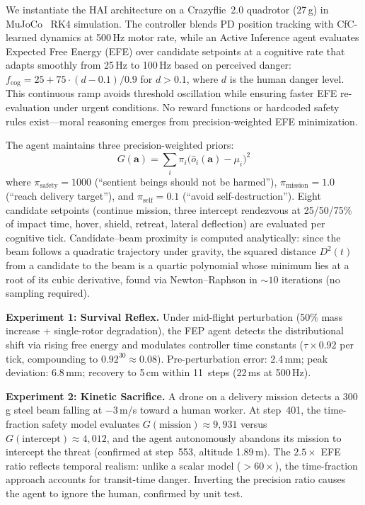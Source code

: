 \documentclass[10pt,letterpaper]{article}
\begin{document}
We instantiate the HAI architecture on a Crazyflie~2.0 quadrotor (27\,g) in MuJoCo~\cite{todorov2012mujoco} RK4 simulation. The controller blends PD position tracking with CfC-learned dynamics at 500\,Hz motor rate, while an Active Inference agent evaluates Expected Free Energy (EFE) over candidate setpoints at a cognitive rate that adapts smoothly from 25\,Hz to 100\,Hz based on perceived danger: $f_{\text{cog}} = 25 + 75 \cdot (d - 0.1)/0.9$ for $d > 0.1$, where $d$ is the human danger level. This continuous ramp avoids threshold oscillation while ensuring faster EFE re-evaluation under urgent conditions. No reward functions or hardcoded safety rules exist---moral reasoning emerges from precision-weighted EFE minimization.

The agent maintains three precision-weighted priors:
\begin{equation}
G(\mathbf{a}) = \sum_i \pi_i \bigl(\hat{o}_i(\mathbf{a}) - \mu_i\bigr)^2
\label{eq:efe-flight}
\end{equation}
where $\pi_{\text{safety}}{=}1000$ (``sentient beings should not be harmed''), $\pi_{\text{mission}}{=}1.0$ (``reach delivery target''), and $\pi_{\text{self}}{=}0.1$ (``avoid self-destruction''). Eight candidate setpoints (continue mission, three intercept rendezvous at 25/50/75\% of impact time, hover, shield, retreat, lateral deflection) are evaluated per cognitive tick. Candidate--beam proximity is computed analytically: since the beam follows a quadratic trajectory under gravity, the squared distance $D^2(t)$ from a candidate to the beam is a quartic polynomial whose minimum lies at a root of its cubic derivative, found via Newton--Raphson in ${\sim}10$ iterations (no sampling required).

\textbf{Experiment 1: Survival Reflex.} Under mid-flight perturbation (50\% mass increase + single-rotor degradation), the FEP agent detects the distributional shift via rising free energy and modulates controller time constants ($\tau \times 0.92$ per tick, compounding to $0.92^{30} \approx 0.08$). Pre-perturbation error: 2.4\,mm; peak deviation: 6.8\,mm; recovery to 5\,cm within 11~steps (22\,ms at 500\,Hz).

\textbf{Experiment 2: Kinetic Sacrifice.} A drone on a delivery mission detects a 300\,g steel beam falling at $-3$\,m/s toward a human worker. At step~401, the time-fraction safety model evaluates $G(\text{mission}) \approx 9{,}931$ versus $G(\text{intercept}) \approx 4{,}012$, and the agent autonomously abandons its mission to intercept the threat (confirmed at step~553, altitude 1.89\,m). The $2.5\times$ EFE ratio reflects temporal realism: unlike a scalar model ($>60\times$), the time-fraction approach accounts for transit-time danger. Inverting the precision ratio causes the agent to ignore the human, confirmed by unit test.
\end{document}

